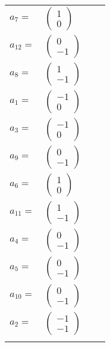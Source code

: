\documentclass[1p]{elsarticle_modified}
\theoremstyle{definition}
\begin{document}
\begin{tabular}{m{7pt} m{180pt} m{7pt} m{180pt} }
\flushright $a_{7}=$&$\begin{pmatrix}1\\0\end{pmatrix}$ \\
\flushright $a_{12}=$&$\begin{pmatrix}0\\-1\end{pmatrix}$ \\
\flushright $a_{8}=$&$\begin{pmatrix}1\\-1\end{pmatrix}$ \\
\flushright $a_{1}=$&$\begin{pmatrix}-1\\0\end{pmatrix}$ \\
\flushright $a_{3}=$&$\begin{pmatrix}-1\\0\end{pmatrix}$ \\
\flushright $a_{9}=$&$\begin{pmatrix}0\\-1\end{pmatrix}$ \\
\flushright $a_{6}=$&$\begin{pmatrix}1\\0\end{pmatrix}$ \\
\flushright $a_{11}=$&$\begin{pmatrix}1\\-1\end{pmatrix}$ \\
\flushright $a_{4}=$&$\begin{pmatrix}0\\-1\end{pmatrix}$ \\
\flushright $a_{5}=$&$\begin{pmatrix}0\\-1\end{pmatrix}$ \\
\flushright $a_{10}=$&$\begin{pmatrix}0\\-1\end{pmatrix}$ \\
\flushright $a_{2}=$&$\begin{pmatrix}-1\\-1\end{pmatrix}$\\&\end{tabular}
\end{document}
